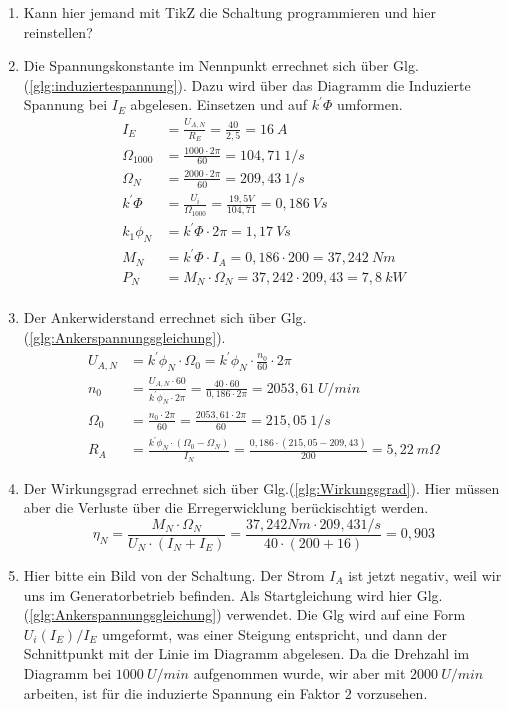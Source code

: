 \begin{solution}
\begin{enumerate}
\item Kann hier jemand mit TikZ die Schaltung programmieren und hier reinstellen?
\item Die Spannungskonstante im Nennpunkt errechnet sich über Glg.(\ref{glg:induziertespannung}). Dazu wird über das Diagramm die Induzierte Spannung bei $I_E$ abgelesen. Einsetzen und auf $k^{'}\Phi$ umformen.
\begin{align}
I_E &= \frac{U_{A,N}}{R_E}=\frac{40}{2,5} = 16~A\\
\Omega_{1000}&= \frac{1000 \cdot 2 \pi}{60} = 104,71~ 1/s\\
\Omega_N&= \frac{2000 \cdot 2 \pi}{60} = 209,43~ 1/s\\
k^{'}\Phi &= \frac{U_i}{\Omega_{1000}} = \frac{19,5V}{104,71}=0,186 ~Vs\\
k_1 \phi_N &= k^{'}\Phi \cdot 2 \pi = 1,17~Vs\\
M_N&=k^{'}\Phi \cdot I_A =0,186 \cdot 200 = 37,242 ~Nm \\
P_N &= M_N \cdot \Omega_N = 37,242 \cdot 209,43 = 7,8 ~kW\\
\end{align}
\item Der Ankerwiderstand errechnet sich über Glg.(\ref{glg:Ankerspannungsgleichung}).
\begin{align}
U_{A,N} & = k^{'}\phi_N \cdot \Omega_0 = k^{'}\phi_N \cdot \frac{n_0}{60} \cdot 2 \pi \\
n_0 & = \frac{U_{A,N} \cdot 60}{k^{'}\phi_N \cdot 2 \pi} = \frac{40 \cdot 60}{0,186 \cdot 2 \pi} = 2053,61 ~U/min\\
\Omega_0 &= \frac{n_0 \cdot 2 \pi}{60} = \frac{2053,61 \cdot 2 \pi}{60}=215,05~1/s\\
R_A &= \frac{k^{'}\phi_N \cdot (\Omega_0 -\Omega_N)}{I_N} =\frac{0,186 \cdot (215,05 -209,43)}{200} = 5,22~m\Omega
\end{align}
\item Der Wirkungsgrad errechnet sich über Glg.(\ref{glg:Wirkungsgrad}). Hier müssen aber die Verluste über die Erregerwicklung berückischtigt werden.
\begin{equation}
\eta_N = \frac{M_N \cdot \Omega_N}{U_N \cdot (I_N+ I_E)} = \frac{37,242 Nm \cdot 209,43 1/s}{40 \cdot (200 + 16)}=0,903
\end{equation}
\item Hier bitte ein Bild von der Schaltung. Der Strom $I_A$ ist jetzt negativ, weil wir uns im Generatorbetrieb befinden. Als Startgleichung wird hier Glg.(\ref{glg:Ankerspannungsgleichung}) verwendet. Die Glg wird auf eine Form $U_i(I_E)/I_E$ umgeformt, was einer Steigung entspricht, und dann der Schnittpunkt mit der Linie im Diagramm abgelesen. Da die Drehzahl im Diagramm bei $1000 ~U/min$ aufgenommen wurde, wir aber mit $2000~U/min$ arbeiten, ist f\"ur die induzierte Spannung ein Faktor $2$ vorzusehen.

\end{enumerate}
\end{solution}
